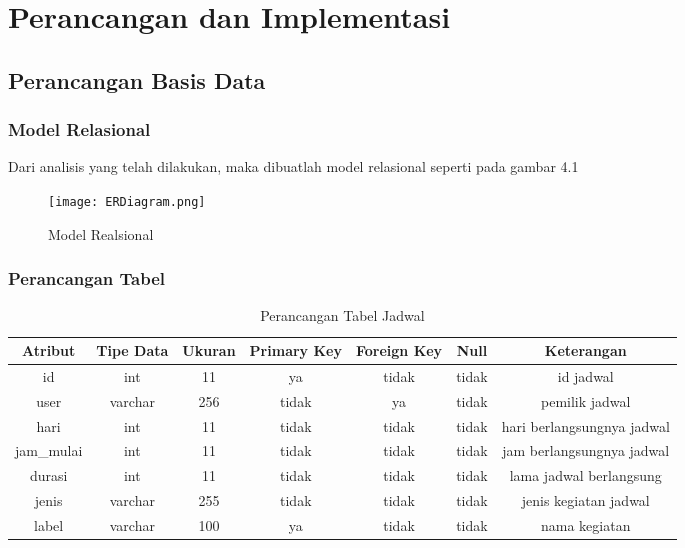 \chapter{Perancangan dan Implementasi}
\label{chap:perancanganDanImplementasi}
\setcounter{secnumdepth}{3}

\paragraph{}
\section{Perancangan Basis Data}
\subsection{Model Relasional}
Dari analisis yang telah dilakukan, maka dibuatlah model relasional seperti pada gambar 4.1

\begin{figure} [H]
	\centering  
	\texttt{[image: ERDiagram.png]}  
	\caption[Model Realsional]{Model Realsional} 
	\label{fig:skematik-phpexcel} 
\end{figure}

\subsection{Perancangan Tabel}
\begin{center}
	\begin{table}[H]
	\begin{tabular}{|c|c|c|c|c|c|c|}
 			\hline
		\textbf{Atribut} & \textbf{Tipe Data} & \textbf{Ukuran} & \textbf{Primary Key} & \textbf{Foreign Key} & \textbf{Null} & \textbf{Keterangan} \\
			\hline
		 id & int & 11 & ya & tidak & tidak & id jadwal\\
			 \hline
			 user & varchar & 256 & tidak & ya & tidak & pemilik jadwal\\
			 \hline
			 hari & int & 11 & tidak & tidak & tidak & hari berlangsungnya jadwal\\
			 \hline
			 jam\_mulai & int & 11 & tidak & tidak & tidak & jam berlangsungnya jadwal\\
			 \hline
			 durasi & int & 11 & tidak & tidak & tidak & lama jadwal berlangsung\\
			 \hline
			 jenis & varchar & 255 & tidak & tidak & tidak & jenis kegiatan jadwal\\
			 \hline
			 label & varchar & 100 & ya & tidak & tidak & nama kegiatan\\
			 \hline
	\end{tabular}
	\caption{Perancangan Tabel Jadwal}
	\end{table}
\end{center}


